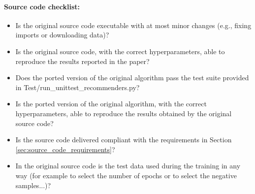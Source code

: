 \paragraph{Source code checklist:}
\begin{itemize}
    \item Is the original source code executable with at most minor changes (e.g., fixing imports or downloading data)? 
    \item Is the original source code, with the correct hyperparameters, able to reproduce the results reported in the paper? 
    \item Does the ported version of the original algorithm pass the test suite provided in Test/run\_unittest\_recommenders.py? 
    \item Is the ported version of the original algorithm, with the correct hyperparameters, able to reproduce the results obtained by the original source code? 
    \item Is the source code delivered compliant with the requirements in Section \ref{sec:source_code_requirements}? 

    \item In the original source code is the test data used during the training in any way (for example to select the number of epochs or to select the negative samples...)? 
\end{itemize}